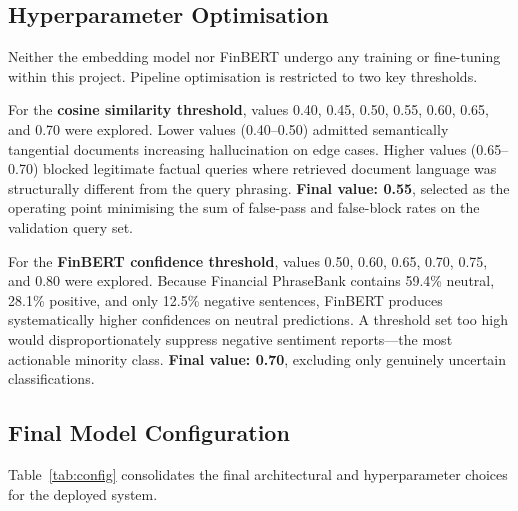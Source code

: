 \documentclass[10pt,journal,compsoc]{IEEEtran}
\begin{document}
\subsection{Hyperparameter Optimisation}

Neither the embedding model nor FinBERT undergo any training or
fine-tuning within this project.
Pipeline optimisation is restricted to two key thresholds.

For the \textbf{cosine similarity threshold}, values 0.40, 0.45,
0.50, 0.55, 0.60, 0.65, and 0.70 were explored.
Lower values (0.40--0.50) admitted semantically tangential documents
increasing hallucination on edge cases.
Higher values (0.65--0.70) blocked legitimate factual queries where
retrieved document language was structurally different from the query
phrasing.
\textbf{Final value: 0.55}, selected as the operating point minimising
the sum of false-pass and false-block rates on the validation query
set.

For the \textbf{FinBERT confidence threshold}, values 0.50, 0.60,
0.65, 0.70, 0.75, and 0.80 were explored.
Because Financial PhraseBank contains 59.4\% neutral, 28.1\% positive,
and only 12.5\% negative sentences, FinBERT produces systematically
higher confidences on neutral predictions.
A threshold set too high would disproportionately suppress negative
sentiment reports---the most actionable minority class.
\textbf{Final value: 0.70}, excluding only genuinely uncertain
classifications.

\subsection{Final Model Configuration}

Table~\ref{tab:config} consolidates the final architectural and
hyperparameter choices for the deployed system.
\end{document}
